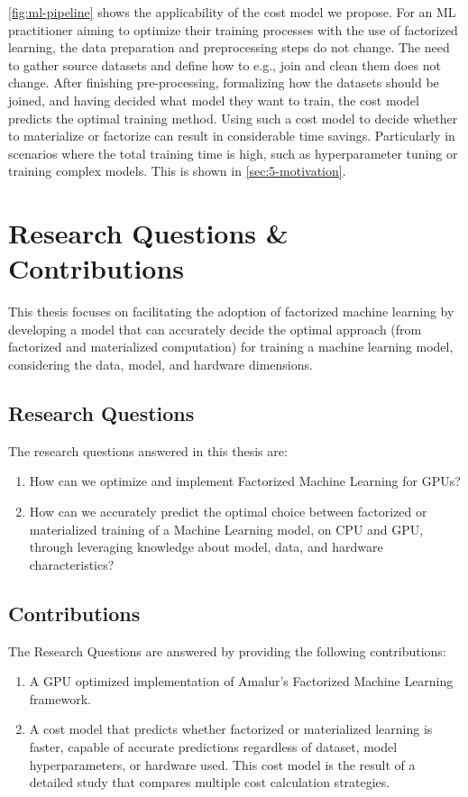 \autoref{fig:ml-pipeline} shows the applicability of the cost model we propose. For an ML practitioner aiming to optimize their training processes with the use of factorized learning, the data preparation and preprocessing steps do not change. The need to gather source datasets and define how to e.g., join and clean them does not change. After finishing pre-processing, formalizing how the datasets should be joined, and having decided what model they want to train, the cost model predicts the optimal training method. Using such a cost model to decide whether to materialize or factorize can result in considerable time savings. Particularly in scenarios where the total training time is high,  such as hyperparameter tuning or training complex models. This is shown in \autoref{sec:5-motivation}.

\section{Research Questions \& Contributions}
This thesis focuses on facilitating the adoption of factorized machine learning by developing a model that can accurately decide the optimal approach (from factorized and materialized computation) for training a machine learning model, considering the data, model, and hardware dimensions.

\subsection{Research Questions}
The research questions answered in this thesis are:
\begin{enumerate}[leftmargin=1.5cm, label=\emph{RQ.\arabic*}]
  \item How can we optimize and implement Factorized Machine Learning for GPUs?
  \item How can we accurately predict the optimal choice between factorized or materialized training of a Machine Learning model, on CPU and GPU, through leveraging knowledge about model, data, and hardware characteristics?
\end{enumerate}

\subsection{Contributions}
The Research Questions are answered by providing the following contributions:
\begin{enumerate}[leftmargin=1.5cm, label=\emph{C.\arabic*}]
  \item A GPU optimized implementation of Amalur's Factorized Machine Learning framework.
  \item A cost model that predicts whether factorized or materialized learning is faster, capable of accurate predictions regardless of dataset, model hyperparameters, or hardware used. This cost model is the result of a detailed study that compares multiple cost calculation strategies.
\end{enumerate}

